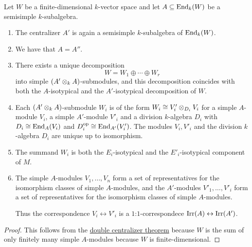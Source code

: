 \begin{corollary}
  \label{corollary: special double centralizer theorem}
  Let $W$ be a finite-dimensional $k$-vector space and let $A \subseteq \operatorname{End}_k(W)$ be a semisimple $k$-subalgebra.
  \begin{enumerate}
    \item
      The centralizer $A'$ is again a semisimple $k$-subalgebra of $\operatorname{End}_k(W)$.
    \item
      We have that $A = A''$.
    \item
      There exists a unique decomposition
      \[
        W = W_1 \oplus \dotsb \oplus W_r
      \]
      into simple $(A' \mathbin{\otimes}_k A)$-submodules, and this decomposition coincides with both the $A$-isotypical and the $A'$-isotypical decomposition of $W$.
    \item
      Each $(A' \mathbin{\otimes}_k A)$-submodule $W_i$ is of the form $W_i \cong V'_i \mathbin{\otimes}_{D_i} V_i$ for a simple $A$-module $V_i$, a simple $A'$-module $V'_i$ and a division $k$-algebra $D_i$ with $D_i \cong \operatorname{End}_A(V_i)$ and $D_i^{\operatorname{op}} \cong \operatorname{End}_{A'}(V'_i)$.
      The modules $V_i, V'_i$ and the division $k$-algebra $D_i$ are unique up to isomorphism.
    \item
      The summand $W_i$ is both the $E_i$-isotypical and the $E'_i$-isotypical component of $M$.
    \item
      The simple $A$-modules $V_1, \dotsc, V_n$ form a set of representatives for the isomorphism classes of simple $A$-modules, and the $A'$-modules $V'_1, \dotsc, V'_i$ form a set of representatives for the isomorphism classes of simple $A$-modules.
      
      Thus the correspondence $V_i \leftrightarrow V'_i$ is a $1$:$1$-correspondece $\operatorname{Irr}(A) \leftrightarrow \operatorname{Irr}(A')$.
  \end{enumerate}
\end{corollary}


\begin{proof}
  This follows from the \hyperref[theorem: general double centralizer theorem]{double centralizer theorem} because $W$ is the sum of only finitely many simple $A$-modules because $W$ is finite-dimensional.
\end{proof}



